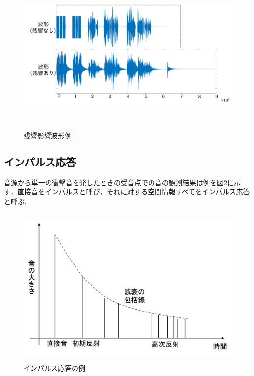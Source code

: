 \documentclass[a4j,11pt]{jsarticle}
\begin{document}
\begin{figure}[h]
\begin{center}
 \includegraphics[clip,width=130mm,height=80mm]{hakeikekka.pdf}
\end{center}
 \caption{残響影響波形例}
 \label{fig:hakei}
\end{figure}

\subsection{インパルス応答}
音源から単一の衝撃音を発したときの受音点での音の観測結果は例を図\ref{fig:impulse}に示す．直接音をインパルスと呼び，それに対する空間情報すべてをインパルス応答と呼ぶ\cite{oka3}．

\begin{figure}[h]
\begin{center}
 \includegraphics[clip,width=140mm,height=80mm]{ImpulseResponse.pdf}
\end{center}
 \caption{インパルス応答の例\cite{oka3}}
 \label{fig:impulse}
\end{figure}
\newpage
\end{document}

